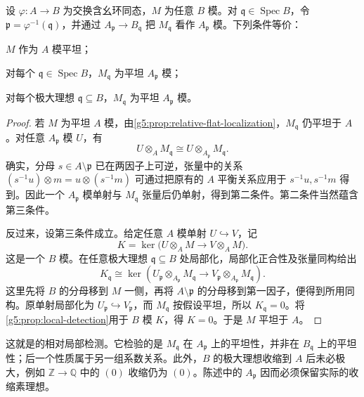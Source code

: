 \begin{proposition}\label{g5:prop:flat-local-test}
	设 \(\varphi:A\to B\) 为交换含幺环同态，\(M\) 为任意 \(B\) 模。对 \(\mathfrak q\in\operatorname{Spec}B\)，令
	\(\mathfrak p=\varphi^{-1}(\mathfrak q)\)，并通过 \(A_{\mathfrak p}\to B_{\mathfrak q}\) 把 \(M_{\mathfrak q}\) 看作 \(A_{\mathfrak p}\) 模。下列条件等价：
	\begin{equivalences}
		\item \(M\) 作为 \(A\) 模平坦；
		\item 对每个 \(\mathfrak q\in\operatorname{Spec}B\)，\(M_{\mathfrak q}\) 为平坦 \(A_{\mathfrak p}\) 模；
		\item 对每个极大理想 \(\mathfrak q\subseteq B\)，\(M_{\mathfrak q}\) 为平坦 \(A_{\mathfrak p}\) 模。
	\end{equivalences}
\end{proposition}
\begin{proof}
	若 \(M\) 为平坦 \(A\) 模，由\cref{g5:prop:relative-flat-localization}，\(M_{\mathfrak q}\) 仍平坦于 \(A\)。对任意 \(A_{\mathfrak p}\) 模 \(U\)，有
	\[
		U\otimes_A M_{\mathfrak q}
		\cong U\otimes_{A_{\mathfrak p}}M_{\mathfrak q}.
	\]
	确实，分母 \(s\in A\setminus\mathfrak p\) 已在两因子上可逆，张量中的关系
	\((s^{-1}u)\otimes m=u\otimes(s^{-1}m)\)
	可通过把原有的 \(A\) 平衡关系应用于 \(s^{-1}u,s^{-1}m\) 得到。因此一个 \(A_{\mathfrak p}\) 模单射与 \(M_{\mathfrak q}\) 张量后仍单射，得到第二条件。第二条件当然蕴含第三条件。

	反过来，设第三条件成立。给定任意 \(A\) 模单射 \(U\hookrightarrow V\)，记
	\[
		K=\ker\bigl(U\otimes_A M\longrightarrow V\otimes_A M\bigr).
	\]
	这是一个 \(B\) 模。在任意极大理想 \(\mathfrak q\subseteq B\) 处局部化，局部化正合性及张量同构给出
	\[
		K_{\mathfrak q}
		\cong\ker\left(
		U_{\mathfrak p}\otimes_{A_{\mathfrak p}}M_{\mathfrak q}
		\longrightarrow
		V_{\mathfrak p}\otimes_{A_{\mathfrak p}}M_{\mathfrak q}
		\right).
	\]
	这里先将 \(B\) 的分母移到 \(M\) 一侧，再将 \(A\setminus\mathfrak p\) 的分母移到第一因子，便得到所用同构。原单射局部化为 \(U_{\mathfrak p}\hookrightarrow V_{\mathfrak p}\)，而 \(M_{\mathfrak q}\) 按假设平坦，所以 \(K_{\mathfrak q}=0\)。将\cref{g5:prop:local-detection}用于 \(B\) 模 \(K\)，得 \(K=0\)。于是 \(M\) 平坦于 \(A\)。
\end{proof}

这就是\cite[第7节，定理7.1，第46--47页]{Matsumura1989}的相对局部检测。它检验的是 \(M_{\mathfrak q}\) 在 \(A_{\mathfrak p}\) 上的平坦性，并非在 \(B_{\mathfrak q}\) 上的平坦性；后一个性质属于另一组系数关系。此外，\(B\) 的极大理想收缩到 \(A\) 后未必极大，例如 \(\mathbb Z\to\mathbb Q\) 中的 \((0)\) 收缩仍为 \((0)\)。陈述中的 \(A_{\mathfrak p}\) 因而必须保留实际的收缩素理想。

